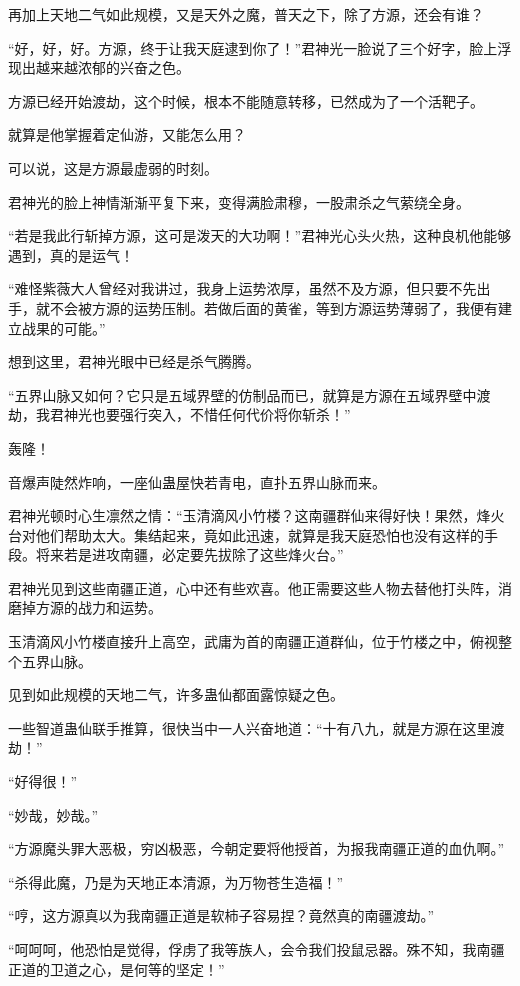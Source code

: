 \begin{this_body}
再加上天地二气如此规模，又是天外之魔，普天之下，除了方源，还会有谁？

“好，好，好。方源，终于让我天庭逮到你了！”君神光一脸说了三个好字，脸上浮现出越来越浓郁的兴奋之色。

方源已经开始渡劫，这个时候，根本不能随意转移，已然成为了一个活靶子。

就算是他掌握着定仙游，又能怎么用？

可以说，这是方源最虚弱的时刻。

君神光的脸上神情渐渐平复下来，变得满脸肃穆，一股肃杀之气萦绕全身。

“若是我此行斩掉方源，这可是泼天的大功啊！”君神光心头火热，这种良机他能够遇到，真的是运气！

“难怪紫薇大人曾经对我讲过，我身上运势浓厚，虽然不及方源，但只要不先出手，就不会被方源的运势压制。若做后面的黄雀，等到方源运势薄弱了，我便有建立战果的可能。”

想到这里，君神光眼中已经是杀气腾腾。

“五界山脉又如何？它只是五域界壁的仿制品而已，就算是方源在五域界壁中渡劫，我君神光也要强行突入，不惜任何代价将你斩杀！”

轰隆！

音爆声陡然炸响，一座仙蛊屋快若青电，直扑五界山脉而来。

君神光顿时心生凛然之情：“玉清滴风小竹楼？这南疆群仙来得好快！果然，烽火台对他们帮助太大。集结起来，竟如此迅速，就算是我天庭恐怕也没有这样的手段。将来若是进攻南疆，必定要先拔除了这些烽火台。”

君神光见到这些南疆正道，心中还有些欢喜。他正需要这些人物去替他打头阵，消磨掉方源的战力和运势。

玉清滴风小竹楼直接升上高空，武庸为首的南疆正道群仙，位于竹楼之中，俯视整个五界山脉。

见到如此规模的天地二气，许多蛊仙都面露惊疑之色。

一些智道蛊仙联手推算，很快当中一人兴奋地道：“十有八九，就是方源在这里渡劫！”

“好得很！”

“妙哉，妙哉。”

“方源魔头罪大恶极，穷凶极恶，今朝定要将他授首，为报我南疆正道的血仇啊。”

“杀得此魔，乃是为天地正本清源，为万物苍生造福！”

“哼，这方源真以为我南疆正道是软柿子容易捏？竟然真的南疆渡劫。”

“呵呵呵，他恐怕是觉得，俘虏了我等族人，会令我们投鼠忌器。殊不知，我南疆正道的卫道之心，是何等的坚定！”


\end{this_body}
